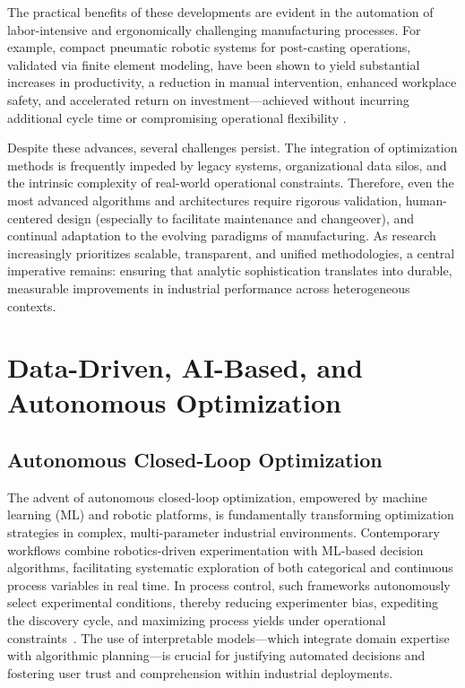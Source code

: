 \documentclass[sigconf]{acmart}
\begin{document}
The practical benefits of these developments are evident in the automation of labor-intensive and ergonomically challenging manufacturing processes. For example, compact pneumatic robotic systems for post-casting operations, validated via finite element modeling, have been shown to yield substantial increases in productivity, a reduction in manual intervention, enhanced workplace safety, and accelerated return on investment—achieved without incurring additional cycle time or compromising operational flexibility \cite{ref62}.

Despite these advances, several challenges persist. The integration of optimization methods is frequently impeded by legacy systems, organizational data silos, and the intrinsic complexity of real-world operational constraints. Therefore, even the most advanced algorithms and architectures require rigorous validation, human-centered design (especially to facilitate maintenance and changeover), and continual adaptation to the evolving paradigms of manufacturing. As research increasingly prioritizes scalable, transparent, and unified methodologies, a central imperative remains: ensuring that analytic sophistication translates into durable, measurable improvements in industrial performance across heterogeneous contexts.

\section{Data-Driven, AI-Based, and Autonomous Optimization}

\subsection{Autonomous Closed-Loop Optimization}

The advent of autonomous closed-loop optimization, empowered by machine learning (ML) and robotic platforms, is fundamentally transforming optimization strategies in complex, multi-parameter industrial environments. Contemporary workflows combine robotics-driven experimentation with ML-based decision algorithms, facilitating systematic exploration of both categorical and continuous process variables in real time. In process control, such frameworks autonomously select experimental conditions, thereby reducing experimenter bias, expediting the discovery cycle, and maximizing process yields under operational constraints~\cite{ref79}. The use of interpretable models—which integrate domain expertise with algorithmic planning—is crucial for justifying automated decisions and fostering user trust and comprehension within industrial deployments.
\end{document}

